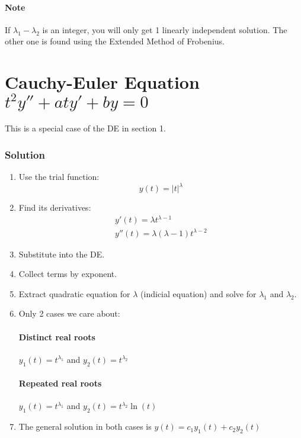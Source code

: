 \documentclass[11pt]{article}
\begin{document}
\paragraph{Note} If $\lambda_1 - \lambda_2$ is an integer, you will only get 1 linearly independent solution. The other one is found using the Extended Method of Frobenius.


\section{Cauchy-Euler Equation $t^2y''+aty'+by=0$}
This is a special case of the DE in section 1.

\subsubsection*{Solution}
\begin{enumerate}

\item Use the trial function:
$$ y(t) = |t|^{\lambda} $$

\item Find its derivatives:
\begin{gather*}
y'(t)= \lambda t^{\lambda -1} \\
y''(t)= \lambda (\lambda-1) t^{\lambda-2}
\end{gather*}

\item Substitute into the DE.
\item Collect terms by exponent.
\item Extract quadratic equation for $\lambda$ (indicial equation) and solve for $\lambda_1$ and $\lambda_2$.
\item Only 2 cases we care about:
\paragraph{Distinct real roots} $y_1(t) = t^{\lambda_1}$ and $y_2(t) = t^{\lambda_2}$
\paragraph{Repeated real roots} $y_1(t) = t^{\lambda_1}$ and $y_2(t) = t^{\lambda_2}\ln(t)$

\item The general solution in both cases is $y(t) = c_1y_1(t)+c_2y_2(t)$
\end{enumerate}
\end{document}
